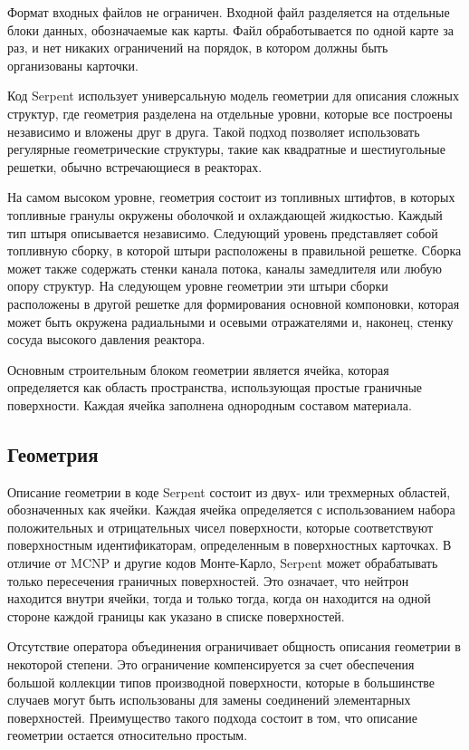 Формат входных файлов не ограничен. Входной файл разделяется на отдельные блоки данных, обозначаемые как карты. Файл обработывается по одной карте за раз, и нет никаких ограничений на порядок, в котором должны быть организованы карточки.

Код Serpent использует универсальную модель геометрии для описания сложных структур, где геометрия разделена на отдельные уровни, которые все построены независимо и вложены друг в друга. Такой подход позволяет использовать регулярные геометрические структуры, такие как квадратные и шестиугольные решетки, обычно встречающиеся в реакторах. 

На самом высоком уровне, геометрия состоит из топливных штифтов, в которых топливные гранулы окружены оболочкой и охлаждающей жидкостью. Каждый тип штыря описывается независимо.
Следующий уровень представляет собой топливную сборку, в которой штыри расположены в правильной решетке. Сборка может также содержать стенки канала потока, каналы замедлителя или любую опору структур. На следующем уровне геометрии эти штыри сборки расположены в другой решетке для формирования основной компоновки, которая может быть окружена радиальными и осевыми отражателями и, наконец, стенку сосуда высокого давления реактора.

Основным строительным блоком геометрии является ячейка, которая определяется как область пространства, использующая простые граничные поверхности. Каждая ячейка заполнена однородным составом материала. 

\subsection{Геометрия}

Описание геометрии в коде Serpent состоит из двух- или трехмерных областей,
обозначенных как ячейки. Каждая ячейка определяется с использованием набора положительных и отрицательных чисел поверхности, которые соответствуют поверхностным идентификаторам, определенным в поверхностных карточках. В отличие от MCNP и другие кодов Монте-Карло, Serpent может обрабатывать только пересечения граничных поверхностей. Это означает, что нейтрон находится внутри ячейки, тогда и только тогда, когда он находится на одной стороне каждой границы
как указано в списке поверхностей.

Отсутствие оператора объединения ограничивает общность описания геометрии в некоторой степени. Это ограничение компенсируется за счет обеспечения большой коллекции типов производной поверхности, которые в большинстве случаев могут быть использованы для замены соединений элементарных поверхностей.
Преимущество такого подхода состоит в том, что описание геометрии остается относительно простым.

